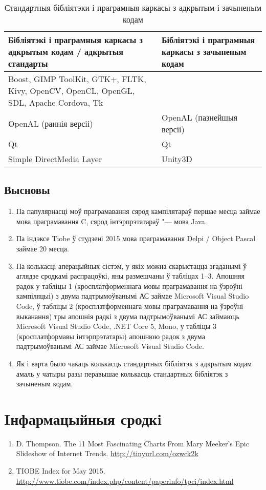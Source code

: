 \documentclass[10pt, a5paper]{article}
\begin{document}
\begin{table}
\caption{Стандартныя бібліятэки і праграмныя каркасы з адкрытым і зачыненым кодам}
\label{z_table4}
  \centering
  \begin{tabular}{p{6cm} p{3.5cm}}
     \hline
    Бібліятэкі і праграмныя каркасы з адкрытым кодам / адкрытыя стандарты & Бібліятэкі і праграмныя каркасы з зачыненым кодам \\ \hline
    Boost, GIMP ToolKit, GTK+, FLTK, Kivy, OpenCV, OpenCL, OpenGL, SDL, Apache Cordova,  Tk &  \\
    OpenAL (раннія версіі) & OpenAL (пазнейшыя версіі) \\
    Qt & Qt \\
    Simple DirectMedia Layer & Unity3D \\ \hline
  \end{tabular}
\end{table}
\subsection*{Высновы}

\begin{enumerate}
  \item Па папулярнасці моў праграмавання сярод кампілятараў першае месца займае мова праграмавання C, сярод інтэрпрэтатараў "--- мова Java.
  \item Па індэксе Tiobe ў студзені 2015 мова праграмавання Delpi / Object Pascal займае 20 месца.
  \item Па колькасці аперацыйных сістэм, у якіх можна скарыстацца згаданымі ў аглядзе сродкамі распрацоўкі, яны размешчаны ў табліцах 1--3. Апошняя радок у табліцы 1 (кросплатформеннага мовы праграмавання на ўзроўні кампіляцыі) з двума падтрымоўванымі АС займае Microsoft Visual Studio Code, ў табліцы 2 (кросплатформеннага мовы праграмавання на ўзроўні выканання) тры апошнія радкі з двума падтрымоўванымі АС займаюць Microsoft Visual Studio Code, .NET Core 5, Mono, у табліцы 3 (кросплатформавы інтэрпрэтатары) апошнюю радок з двума падтрымоўванымі АС займае Microsoft Visual Studio Code.
  \item Як і варта было чакаць колькасць стандартных бібліятэк з адкрытым кодам амаль у чатыры разы перавышае колькасць стандартных бібліятэк з зачыненым кодам.
\end{enumerate}

\section*{Iнфармацыйныя сродкi}

\begin{enumerate}
\item D. Thompson. The 11 Most Fascinating Charts From Mary Meeker's Epic Slideshow of Internet Trends. \url{http://tinyurl.com/ozwck2k}
\item TIOBE Index for May 2015. \url{http://www.tiobe.com/index.php/content/paperinfo/tpci/index.html} \end{enumerate}
\end{document}

